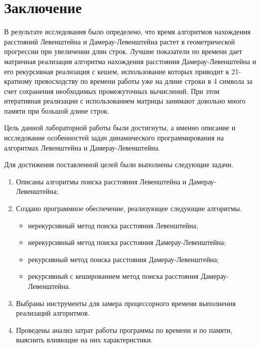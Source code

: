 \chapter*{Заключение}

В результате исследования было определено, что время алгоритмов нахождения расстояний Левенштейна и Дамерау-Левенштейна растет в геометрической прогрессии при увеличении длин строк. Лучшие показатели по времени дает матричная реализация алгоритма нахождения расстояния Дамерау-Левенштейна и его рекурсивная реализация с кешем, использование которых приводит к 21-кратному превосходству по времени работы уже на длине строки в 4 символа за счет сохранения необходимых промежуточных вычислений. При этом итеративная реализации с использованием матрицы занимают довольно много памяти при большой длине строк. 

Цель данной лабораторной работы были достигнуты, а именно описание и исследование особенностей задач динамического программирования на алгоритмах Левенштейна и Дамерау-Левенштейна.

Для достижения поставленной целей были выполнены следующие задачи.
\begin{enumerate}[label={\arabic*)}]
	\item Описаны алгоритмы поиска расстояния Левенштейна и \newline Дамерау-Левенштейна;
	\item Создано программное обеспечение, реализующее следующие алгоритмы.
	\begin{itemize}[label=---]
		\item нерекурсивный метод поиска расстояния Левенштейна;
		\item нерекурсивный метод поиска расстояния Дамерау-Левенштейна;
		\item рекурсивный метод поиска расстояния Дамерау-Левенштейна;
		\item рекурсивный с кешированием метод поиска расстояния Дамерау-Левенштейна.
	\end{itemize}
	\item Выбраны инструменты для замера процессорного времени выполнения реализаций алгоритмов.
	\item Проведены анализ затрат работы программы по времени и по памяти, выяснить влияющие на них характеристики. 
\end{enumerate}

